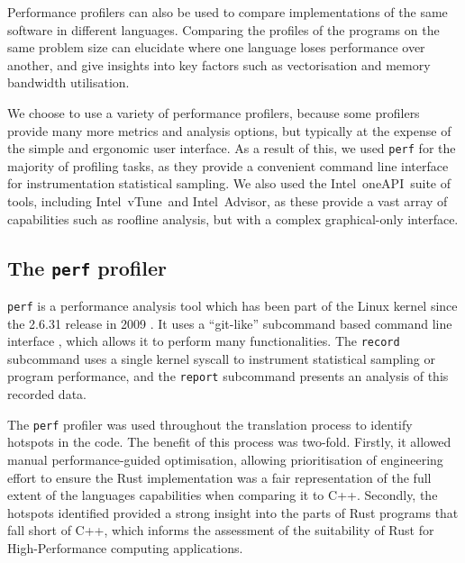 Performance profilers can also be used to compare implementations of the same software in different languages. Comparing the  profiles of the programs on the same problem size can elucidate where one language loses performance over another, and give insights into key factors such as vectorisation and memory bandwidth utilisation.

We choose to use a variety of performance profilers, because some profilers provide many more metrics and analysis options, but typically at the expense of the simple and ergonomic user interface. As a result of this, we used \texttt{perf} for the majority of profiling tasks, as they provide a convenient command line interface for instrumentation statistical sampling. We also used the Intel\textregistered\ oneAPI\texttrademark\ suite of tools, including Intel\textregistered\ vTune\texttrademark\ and Intel\textregistered\ Advisor\texttrademark, as these provide a vast array of capabilities such as roofline analysis, but with a complex graphical-only interface.


\subsection{The \texttt{perf} profiler}
\label{ssec:perf-profiler}

\texttt{perf} is a performance analysis tool which has been part of the Linux kernel since the 2.6.31 release in 2009 \cite{PerfcountersAddedMainline}. It uses a ``git-like'' subcommand based command line interface  \cite{de2010new}, which allows it to perform many functionalities. The \texttt{record} subcommand uses a single kernel syscall to instrument statistical sampling or program performance, and the \texttt{report} subcommand presents an analysis of this recorded data.

The \texttt{perf} profiler was used throughout the translation process to identify hotspots in the code. The benefit of this process was two-fold. Firstly, it allowed manual performance-guided optimisation, allowing prioritisation of engineering effort to ensure the Rust implementation was a fair representation of the full extent of the languages capabilities when comparing it to C++. Secondly, the hotspots identified provided a strong insight into the parts of Rust programs that fall short of C++, which informs the assessment of the suitability of Rust for High-Performance computing applications.

